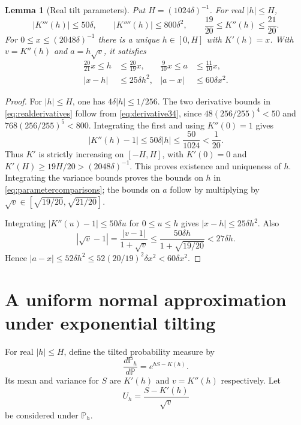 \documentclass[11pt]{article}
\numberwithin{equation}{section}
\newtheorem{lemma}[theorem]{Lemma}
\theoremstyle{remark}
\newcommand{\Pp}{\mathbb P}
\begin{document}
\begin{lemma}[Real tilt parameters]\label{lem:parameters}
Put $H=(1024\delta)^{-1}$. For real $|h|\le H$,
\begin{equation}\label{eq:realderivatives}
 |K'''(h)|\le50\delta,
 \qquad |K''''(h)|\le800\delta^2,
 \qquad \frac{19}{20}\le K''(h)\le\frac{21}{20}.
\end{equation}
For $0\le x\le(2048\delta)^{-1}$ there is a unique $h\in[0,H]$
with $K'(h)=x$. With $v=K''(h)$ and $a=h\sqrt v$, it satisfies
\begin{align}
 \frac{20}{21}x\le h&\le\frac{20}{19}x,
 &\frac9{10}x\le a&\le\frac{11}{10}x,
 \label{eq:parametercomparisons}\\
 |x-h|&\le25\delta h^2,
 &|a-x|&\le60\delta x^2.
 \label{eq:parameterdifferences}
\end{align}
\end{lemma}
\begin{proof}
For $|h|\le H$, one has $4\delta|h|\le1/256$. The two derivative
bounds in \eqref{eq:realderivatives} follow from
\eqref{eq:derivative34}, since
$48(256/255)^4<50$ and $768(256/255)^5<800$.
Integrating the first and using $K''(0)=1$ gives
\[
 |K''(h)-1|\le50\delta|h|\le\frac{50}{1024}<\frac1{20}.
\]
Thus $K'$ is strictly increasing on $[-H,H]$, with $K'(0)=0$ and
$K'(H)\ge19H/20>(2048\delta)^{-1}$. This proves existence and uniqueness
of $h$. Integrating the variance bounds proves the bounds on $h$ in
\eqref{eq:parametercomparisons}; the bounds on $a$ follow by multiplying by
$\sqrt v\in[\sqrt{19/20},\sqrt{21/20}]$.

Integrating $|K''(u)-1|\le50\delta u$ for $0\le u\le h$ gives
$|x-h|\le25\delta h^2$. Also
\[
 |\sqrt v-1|=\frac{|v-1|}{1+\sqrt v}
 \le\frac{50\delta h}{1+\sqrt{19/20}}<27\delta h.
\]
Hence $|a-x|\le52\delta h^2\le52(20/19)^2\delta x^2<60\delta x^2$.
\end{proof}

\section{A uniform normal approximation under exponential tilting}
\label{sec:tiltedCLT}

For real $|h|\le H$, define the tilted probability measure by
\begin{equation}\label{eq:tilt}
 \frac{d\Pp_h}{d\Pp}=e^{hS-K(h)}.
\end{equation}
Its mean and variance for $S$ are $K'(h)$ and $v=K''(h)$ respectively.
Let
\[
 U_h=\frac{S-K'(h)}{\sqrt v}
\]
be considered under $\Pp_h$.
\end{document}
